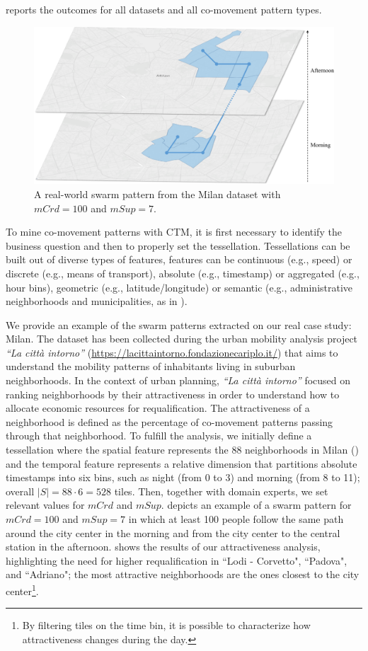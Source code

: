 \documentclass[
]{ceurart}
\renewcommand{\sf}[1]{\textsf{\textup{#1}}}
\begin{document}
 reports the outcomes for all datasets and all co-movement pattern types.
\begin{figure}[t]
    \centering
    \includegraphics[scale=.3]{qualitativeswarm.pdf}
    \caption{A real-world swarm pattern from the \sf{Milan} dataset with $mCrd=100$ and $mSup=7$.}
    \label{fig:qualitativeswarm}
\end{figure}
%
To mine co-movement patterns with CTM, it is first necessary to identify the business question and then to properly set the tessellation. 
Tessellations can be built out of diverse types of features, features can be continuous (e.g., speed) or discrete (e.g., means of transport), absolute (e.g., timestamp) or aggregated (e.g., hour bins), geometric (e.g., latitude/longitude) or semantic (e.g., administrative neighborhoods and municipalities, as in ).

We provide an example of the swarm patterns extracted on our real case study: \sf{Milan}.
The dataset has been collected during the urban mobility analysis project \textit{``La città intorno''} (\url{https://lacittaintorno.fondazionecariplo.it/}) that aims to understand the mobility patterns of inhabitants living in suburban neighborhoods.
In the context of urban planning, \textit{``La città intorno''} focused on ranking neighborhoods by their attractiveness in order to understand how to allocate economic resources for requalification.
The attractiveness of a neighborhood is defined as the percentage of co-movement patterns passing through that neighborhood.
To fulfill the analysis, we initially define a tessellation where the spatial feature represents the 88 neighborhoods in Milan () and the temporal feature represents a relative dimension that partitions absolute timestamps into six bins, such as night (from 0 to 3) and morning (from 8 to 11); overall $|S| = 88 \cdot 6 = 528$ tiles.
Then, together with domain experts, we set relevant values for $mCrd$ and $mSup$.  depicts an example of a swarm pattern for $mCrd=100$ and $mSup=7$ in which at least 100 people follow the same path around the city center in the morning and from the city center to the central station in the afternoon.
 shows the results of our attractiveness analysis, highlighting the need for higher requalification in ``Lodi - Corvetto", ``Padova", and ``Adriano"; the most attractive neighborhoods are the ones closest to the city center\footnote{By filtering tiles on the time bin, it is possible to characterize how attractiveness changes during the day.}.
\end{document}
